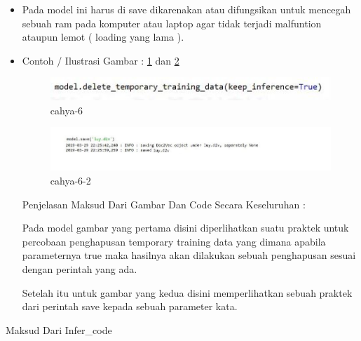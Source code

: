 \begin{itemize}
\item Pada model ini harus di save dikarenakan atau difungsikan untuk mencegah sebuah ram pada komputer atau laptop agar tidak terjadi malfuntion ataupun lemot ( loading yang lama ). 
\item Contoh / Ilustrasi Gambar : \ref{cahya-6} dan \ref{cahya-6-2}
\par
\begin{figure}[!hbtp]
\centering
\includegraphics[scale=0.3]{figures/cahya-6.jpg}
\caption{cahya-6}
\label{cahya-6}
\end{figure}
\par
\begin{figure}[!hbtp]
\centering
\includegraphics[scale=0.3]{figures/cahya-6-2.jpg}
\caption{cahya-6-2}
\label{cahya-6-2}
\end{figure}
\par
\par Penjelasan  Maksud Dari Gambar Dan Code Secara Keseluruhan : 
\par Pada model gambar yang pertama disini diperlihatkan suatu praktek untuk percobaan penghapusan temporary training data yang dimana apabila parameternya true maka hasilnya akan  dilakukan sebuah penghapusan sesuai dengan perintah yang ada.
\par Setelah itu untuk gambar yang kedua disini memperlihatkan sebuah praktek dari perintah save kepada sebuah parameter kata.
\end{itemize}
\item Maksud Dari Infer\_code
